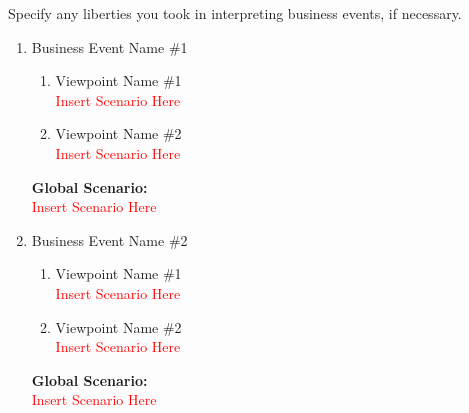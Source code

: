 \documentclass[]{article}
\begin{document}
 Specify any liberties you took in interpreting business events, if necessary.\\

\begin{enumerate}[{\bf BE1.}]
	\item Business Event Name \#1
		\begin{enumerate}[{\bf VP1.}]
			\item Viewpoint Name \#1 \\
				\textcolor{red}{Insert Scenario Here}
			\item Viewpoint Name \#2 \\
				\textcolor{red}{Insert Scenario Here}
		\end{enumerate}
		{\bf Global Scenario:}\\
		\textcolor{red}{Insert Scenario Here}
	\item Business Event Name \#2
	\begin{enumerate}[{\bf VP1.}]
		\item Viewpoint Name \#1 \\
		\textcolor{red}{Insert Scenario Here}
		\item Viewpoint Name \#2 \\
		\textcolor{red}{Insert Scenario Here}
	\end{enumerate}
	{\bf Global Scenario:}\\
	\textcolor{red}{Insert Scenario Here}
\end{enumerate}
\end{document}
